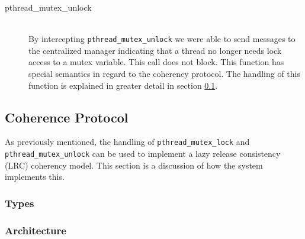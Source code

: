 \begin{description}
\item[pthread\_mutex\_unlock] \hfill \\
By intercepting \verb,pthread_mutex_unlock, we were able to send messages to the centralized manager indicating that a thread no longer needs lock access to a mutex variable.  This call does not block.  This function has special semantics in regard to the coherency protocol.   The handling of this function is explained in greater detail in section \ref{coherency-protocol}.
\end{description}

\subsection{Coherence Protocol}
\label{coherency-protocol}

As previously mentioned, the handling of \verb,pthread_mutex_lock, and \verb,pthread_mutex_unlock, can be used to implement a lazy release consistency (LRC) coherency model.  This section is a discussion of how the \projname{} system implements this.

\subsubsection{Types}
\subsubsection{Architecture}

